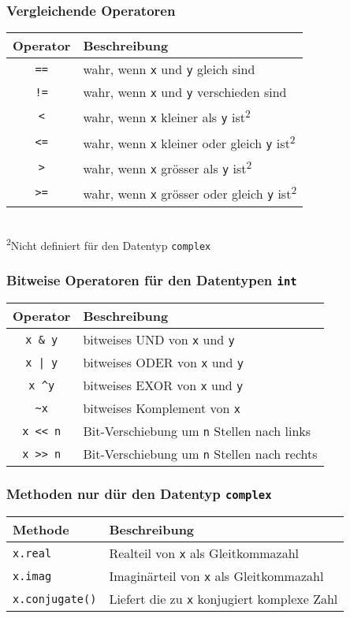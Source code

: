 \subsubsection{Vergleichende Operatoren}
\begin{tabular}{|c|l|}
	\hline 
	\textbf{Operator} &\textbf{Beschreibung}\\ 
	\hline 
	\texttt{==} &wahr, wenn \texttt{x} und \texttt{y} gleich sind\\ 
	\texttt{!=} &wahr, wenn \texttt{x} und \texttt{y} verschieden sind\\ 
	\texttt{<} &wahr, wenn \texttt{x} kleiner als \texttt{y} ist\textsuperscript{2}\\ 
	\texttt{<=} &wahr, wenn \texttt{x} kleiner oder gleich \texttt{y} ist\textsuperscript{2}\\ 
	\texttt{>} &wahr, wenn \texttt{x} grösser als \texttt{y} ist\textsuperscript{2}\\ 
	\texttt{>=} &wahr, wenn \texttt{x} grösser oder gleich \texttt{y} ist\textsuperscript{2}\\ 
	\hline 
\end{tabular}\\
\textsuperscript{2}Nicht definiert für den Datentyp \texttt{complex}\\

\subsubsection{Bitweise Operatoren für den Datentypen \texttt{int}}
\begin{tabular}{|c|l|}
	\hline 
	\textbf{Operator} &\textbf{Beschreibung}\\ 
	\hline 
	\texttt{x \& y} &bitweises UND von \texttt{x} und \texttt{y}\\ 
	\texttt{x | y} &bitweises ODER von \texttt{x} und \texttt{y}\\
	\texttt{x \textasciicircum y} &bitweises EXOR von \texttt{x} und \texttt{y}\\ 
	\texttt{\textasciitilde x} &bitweises Komplement von \texttt{x}\\ 
	\texttt{x << n} &Bit-Verschiebung um \texttt{n} Stellen nach links\\ 
	\texttt{x >> n} &Bit-Verschiebung um \texttt{n} Stellen nach rechts\\ 
	\hline 
\end{tabular}

\subsubsection{Methoden nur dür den Datentyp \texttt{complex}}
\begin{tabular}{|l|l|}
	\hline 
	\textbf{Methode} &\textbf{Beschreibung}\\ 
	\hline 
	\texttt{x.real} &Realteil von \texttt{x} als Gleitkommazahl\\
	\texttt{x.imag} &Imaginärteil von \texttt{x} als Gleitkommazahl\\ 
	\texttt{x.conjugate()} &Liefert die zu \texttt{x} konjugiert komplexe Zahl\\  
	\hline 
\end{tabular}

